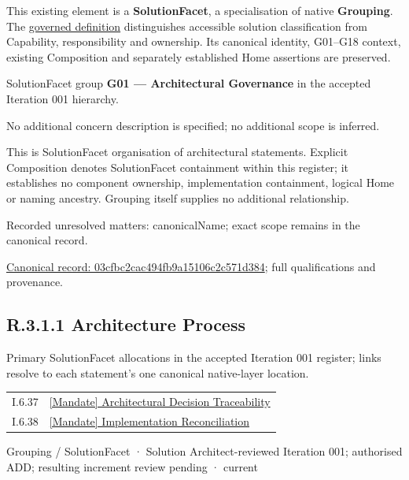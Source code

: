 This existing element is a \textbf{SolutionFacet}, a specialisation of native
\textbf{Grouping}. The \href{\detokenize{../../../../../../../governance/continuum-representation.md#solutionfacet-classification--1119-candidate}}{governed definition}
distinguishes accessible solution classification from Capability, responsibility
and ownership. Its canonical identity, G01–G18 context, existing Composition
and separately established Home assertions are preserved.



SolutionFacet group \textbf{G01 — Architectural Governance} in the accepted Iteration 001 hierarchy.



No additional concern description is specified; no additional scope is inferred.



This is SolutionFacet organisation of architectural statements. Explicit Composition denotes SolutionFacet containment within this register; it establishes no component ownership, implementation containment, logical Home or naming ancestry. Grouping itself supplies no additional relationship.


{\small Recorded unresolved matters: canonicalName; exact scope remains in the canonical record.}\par
{\footnotesize \href{../../../../../../../continuum/grouping/03cfbc2cac494fb9a15106c2c571d384.md}{Canonical record: 03cfbc2cac494fb9a15106c2c571d384}; full qualifications and provenance.}\par
\subsection*{R.3.1.1 Architecture Process}
\label{navigation:R.3.1.1}

Primary SolutionFacet allocations in the accepted Iteration 001 register; links resolve to each statement’s one canonical native-layer location.\par
\begin{longtable}{p{.22\linewidth}p{.73\linewidth}}
I.6.37 & \hyperref[element:ae28fe841f6b476da4393c5e3c6a2eab]{[Mandate] Architectural Decision Traceability} \\
I.6.38 & \hyperref[element:5acccfa8cf634669a26bb31010926720]{[Mandate] Implementation Reconciliation} \\
\end{longtable}
\label{element:2ee0a6e46b47413d91cfb71ee3100e4b}
{\small Grouping / SolutionFacet · Solution Architect-reviewed Iteration 001; authorised ADD; resulting increment review pending · current}\par

